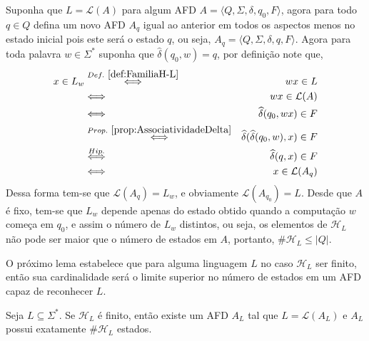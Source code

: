\begin{prova}
	Suponha que $L = \mathcal{L}(A)$ para algum AFD $A = \langle Q, \Sigma, \delta, q_0, F\rangle$, agora para todo $q \in Q$ defina um novo AFD $A_q$ igual ao anterior em todos os aspectos menos no estado inicial pois este será o estado $q$, ou seja,  $A_q = \langle Q, \Sigma, \delta, q, F\rangle$. Agora para toda palavra $w \in \Sigma^*$ suponha que $\widehat{\delta}(q_0, w) = q$, por definição note que, 
	\begin{eqnarray*}
		x \in L_w & \stackrel{Def. \ \ref{def:FamiliaH-L}}{\Longleftrightarrow} & wx \in L\\
		& \Longleftrightarrow & wx \in \mathcal{L}(A)\\
		& \Longleftrightarrow & \widehat{\delta}(q_0, wx) \in F\\
		& \stackrel{Prop. \ \ref{prop:AssociatividadeDelta}}{\Longleftrightarrow} & \widehat{\delta}(\widehat{\delta}(q_0, w), x) \in F\\
		& \stackrel{Hip.}{\Longleftrightarrow} & \widehat{\delta}(q, x) \in F\\
		& \Longleftrightarrow & x \in \mathcal{L}(A_q)
	\end{eqnarray*}
	Dessa forma tem-se que $\mathcal{L}(A_q) = L_w$, e obviamente $\mathcal{L}(A_{q_0}) = L$. Desde que  $A$ é fixo, tem-se que $L_w$ depende apenas do estado obtido quando a computação $w$ começa em $q_0$, e assim o número de $L_w$ distintos, ou seja, os elementos de $\mathcal{H}_L$ não pode ser maior que o número de estados em $A$, portanto, $\#\mathcal{H}_L \leq |Q|$.
\end{prova}

O próximo lema estabelece que para alguma linguagem $L$ no caso $\mathcal{H}_L$ ser finito, então sua cardinalidade será o limite superior no número de estados em um AFD capaz de reconhecer $L$.

\begin{lema}\label{lema:LimiteSuperiorEstados}
	Seja $L \subseteq \Sigma^*$. Se $\mathcal{H}_L$ é finito, então existe um AFD $A _L$ tal que $L = \mathcal{L}(A_L)$ e $A_L$ possui exatamente $\#\mathcal{H}_L$ estados.
\end{lema}

